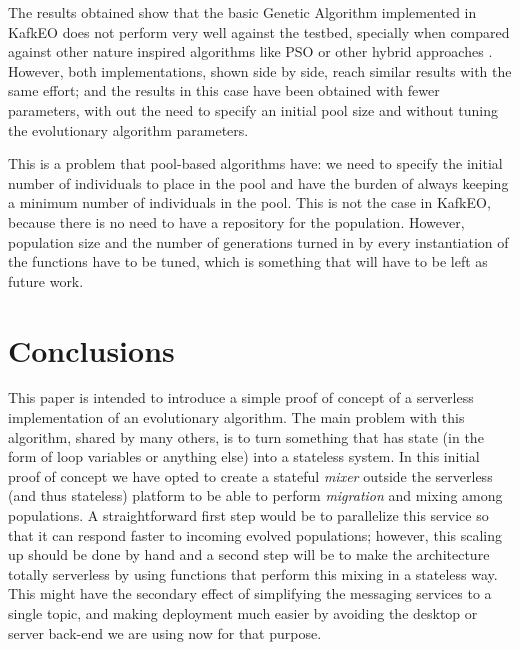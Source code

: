 \documentclass{llncs}
\begin{document}
The results obtained show that the basic Genetic Algorithm implemented
  in KafkEO does not perform
  very well against the testbed, specially when compared against other nature
  inspired algorithms like PSO or other hybrid approaches \cite{hansen2010bbob}.
  However, both implementations, shown side by side, reach similar results with the same
  effort; and the results in this case have been obtained with fewer
  parameters, with out the need to specify an initial pool size and
  without tuning the evolutionary algorithm parameters.

  This is a problem that pool-based algorithms have: we need to
  specify the initial number of individuals to place in the pool and have the
  burden of always keeping a minimum number of individuals in the pool. This
  is not the case in KafkEO, because there is no need to have a
  repository for the population. However, population size and the number
  of generations turned in by every instantiation of the functions have
  to be tuned, which is something that will have to be left as future
  work.


  \section{Conclusions}
  \label{sec:con}

  This paper is intended to introduce a simple proof of concept of a
  serverless implementation of an evolutionary algorithm. The main
  problem with this algorithm, shared by many others, is to turn
  something that has state (in the form of loop variables or anything
  else) into a stateless system. In this initial proof of concept we have
  opted to create a stateful {\em mixer} outside the serverless (and
  thus stateless) platform to be able to perform {\em
    migration} and mixing among populations. A straightforward first step
  would be to parallelize this service so that it can respond faster to
  incoming evolved populations; however, this scaling up should be done
  by hand and a second step will be to make the architecture totally
  serverless by using functions that perform this mixing in a stateless
  way. This might have the secondary effect of simplifying the messaging
  services to a single topic, and making deployment much easier by
  avoiding the desktop or server back-end we are using now for that
  purpose.
\end{document}
